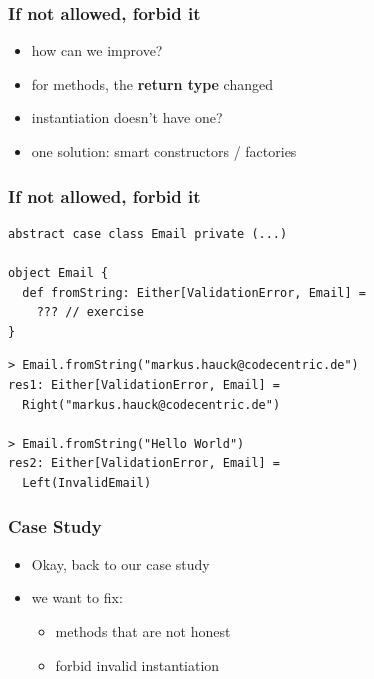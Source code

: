 \documentclass{beamer}
\begin{document}
\begin{frame}
  \frametitle{If not allowed, forbid it}
  \begin{itemize}
  \item how can we improve?
  \item for methods, the \textbf{return type} changed
  \item instantiation doesn't have one?
  \item one solution: smart constructors / factories
  \end{itemize}
\end{frame}

\begin{frame}
  \frametitle{If not allowed, forbid it}
\begin{verbatim}
abstract case class Email private (...)

object Email {
  def fromString: Either[ValidationError, Email] = 
    ??? // exercise
}
\end{verbatim}

\begin{verbatim}
> Email.fromString("markus.hauck@codecentric.de")
res1: Either[ValidationError, Email] = 
  Right("markus.hauck@codecentric.de")

> Email.fromString("Hello World")
res2: Either[ValidationError, Email] = 
  Left(InvalidEmail)
\end{verbatim}
\end{frame}

\begin{frame}
  \frametitle{Case Study}
  \begin{itemize}
  \item Okay, back to our case study
  \item we want to fix:
    \begin{itemize}
    \item methods that are not honest
    \item forbid invalid instantiation
    \end{itemize}
  \end{itemize}
\end{frame}

\begin{frame}[fragile,c]
  
  \inputminted[fontsize=\small, firstline=3, lastline=22]{scala}{../src/main/scala/de/codecentric/two/VendingMachine.scala}
\end{frame}

\begin{frame}[fragile,c]
  \inputminted[fontsize=\small, firstline=24]{scala}{../src/main/scala/de/codecentric/two/VendingMachine.scala}
\end{frame}
\end{document}
